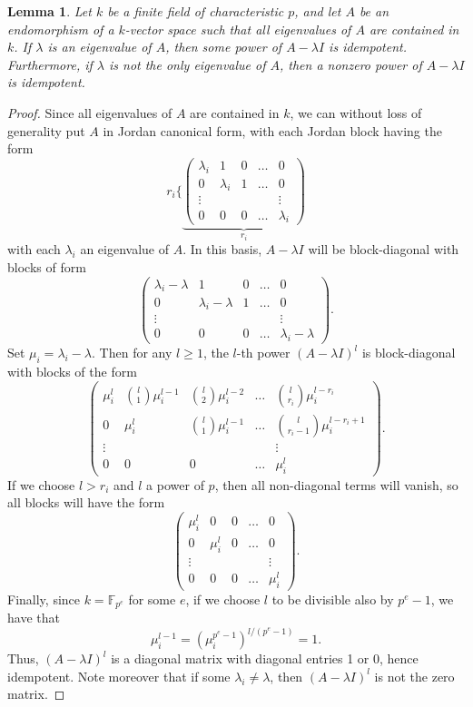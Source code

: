 \documentclass[12pt]{article}
\let\l\lambda
\theoremstyle{theorem}
\numberwithin{thm}{section}
\newtheorem{lem}[thm]{Lemma}
\theoremstyle{definition}
\begin{document}
\begin{lem}\label{lem:jordan}
  Let $k$ be a finite field of characteristic $p$, and let $A$ be an endomorphism of a $k$-vector space such that all eigenvalues of $A$ are contained in $k$. If $\l$ is an eigenvalue of $A$, then some power of $A-\l I$ is idempotent.
Furthermore, if $\l$ is not the only eigenvalue of $A$, then a  nonzero power of $A-\l I$ is idempotent.
\end{lem}
\begin{proof}
  Since all eigenvalues of $A$ are contained in $k$, we can without loss of generality put $A$ in Jordan canonical form, with each Jordan block having the form
  \[ r_i\Biggl\{
  \underbrace{\begin{pmatrix}
      \l_i & 1 & 0 & \dots & 0 \\
      0 & \l_i & 1  & \dots & 0 \\
      \vdots & & & & \vdots \\
      0 & 0 & 0 & \dots & \l_i
  \end{pmatrix}}_{r_i} \]
  with each $\l_i$ an eigenvalue of $A$.
  In this basis, $A-\l I$ will be block-diagonal with blocks of form
  \[ \begin{pmatrix}
    \l_i-\l & 1 & 0 & \dots & 0 \\
    0 & \l_i-\l & 1 & \dots & 0 \\
    \vdots & & & & \vdots \\
    0 & 0 & 0 & \dots & \l_i-\l
  \end{pmatrix}. \]
  Set $\mu_i=\l_i-\l$. Then for any $l\geq 1$, the $l$-th power $(A-\l I)^l$ is block-diagonal with blocks of the form
  \[ \begin{pmatrix}
    \mu_i^l & \binom{l}1\mu_i^{l-1} & \binom{l}2\mu_i^{l-2} & \dots & \binom{l}{r_i}\mu_i^{l-r_i} \\
    0 & \mu_i^l & \binom{l}1\mu_i^{l-1} & \dots & \binom{l}{r_i-1}\mu_i^{l-r_i+1} \\
    \vdots & & & & \vdots \\
    0 & 0 & 0 & \dots & \mu_i^l
  \end{pmatrix}. \]
  If we choose $l > r_i$ and $l$ a power of $p$, then all non-diagonal terms will vanish, so all blocks will have the form
  \[ \begin{pmatrix}
    \mu_i^l & 0 & 0 & \dots & 0 \\
    0 & \mu_i^l & 0 & \dots & 0 \\
    \vdots & & & & \vdots \\
    0 & 0 & 0 & \dots & \mu_i^l
  \end{pmatrix}. \]
  Finally, since $k=\mathbb F_{p^e}$ for some $e$, if we choose $l$ to be divisible also by $p^e-1$, we have that $$\mu_i^{l-1} = (\mu_i^{p^{e}-1})^{l/(p^{e}-1)} =1.$$
  Thus, $(A-\l I)^l$ is a diagonal matrix with diagonal entries 1 or 0, hence idempotent. Note moreover that if some $\l_i\neq \l$, then $(A-\l I)^l$ is not the zero matrix.
\end{proof}
\end{document}
